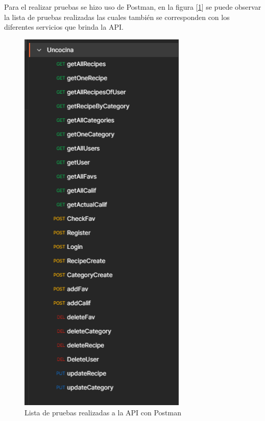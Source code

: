 Para el realizar pruebas se hizo uso de Postman, en la figura [\ref{fig:postman}] se puede observar la lista de pruebas realizadas las cuales también se corresponden con los diferentes servicios que brinda la API.

\begin{figure}[!htb]
  \centering
  \includegraphics[width=8cm, scale=1]{Images/Imagenes/postman.png}
  \caption{Lista de pruebas realizadas a la API con Postman}
  \label{fig:postman}
\end{figure}

